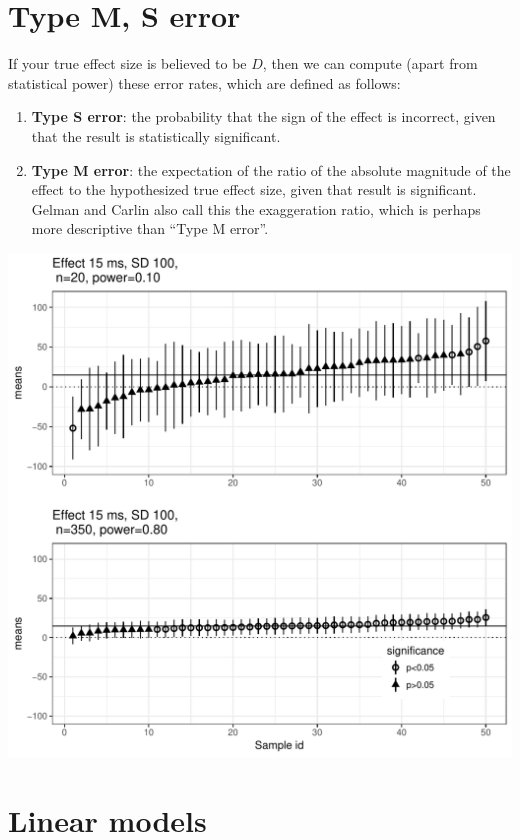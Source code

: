 \documentclass[12pt]{article}
\begin{document}
\section{Type M, S error}

If your true effect size is believed to be $D$, 
then we can compute (apart from statistical power) these error rates, which are defined as follows:

\begin{enumerate}
\item
\textbf{Type S error}: the probability that the sign of the effect is incorrect, given that the result is statistically significant.
\item 
\textbf{Type M error}: the expectation of the ratio of the absolute magnitude of the effect to the hypothesized true effect size, given that result is significant. 
Gelman and Carlin also call this the exaggeration ratio, which is perhaps more descriptive than ``Type M error''.
\end{enumerate}

{\centering \includegraphics{figures/fig-demotypeM-1} 
}


\section{Linear models}
\end{document}
